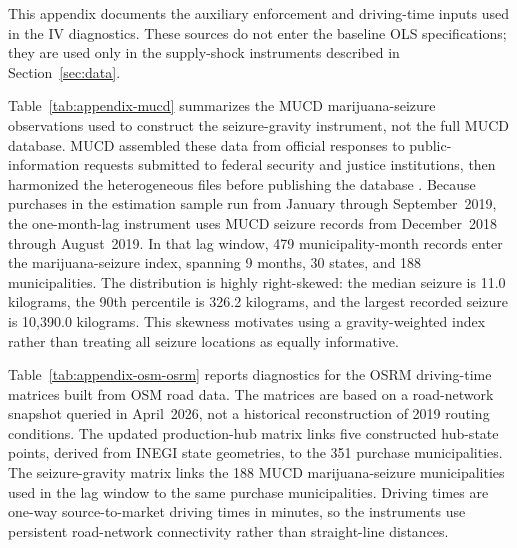 
This appendix documents the auxiliary enforcement and driving-time inputs used in the IV diagnostics.  These sources do not enter the baseline OLS specifications; they are used only in the supply-shock instruments described in Section~\ref{sec:data}.

Table~\ref{tab:appendix-mucd} summarizes the MUCD marijuana-seizure observations used to construct the seizure-gravity instrument, not the full MUCD database.  MUCD assembled these data from official responses to public-information requests submitted to federal security and justice institutions, then harmonized the heterogeneous files before publishing the database \citep{mucd2019seizures}.  Because purchases in the estimation sample run from January through September~2019, the one-month-lag instrument uses MUCD seizure records from December~2018 through August~2019.  In that lag window, 479 municipality-month records enter the marijuana-seizure index, spanning 9 months, 30 states, and 188 municipalities.  The distribution is highly right-skewed: the median seizure is 11.0 kilograms, the 90th percentile is 326.2 kilograms, and the largest recorded seizure is 10{,}390.0 kilograms.  This skewness motivates using a gravity-weighted index rather than treating all seizure locations as equally informative.



Table~\ref{tab:appendix-osm-osrm} reports diagnostics for the OSRM driving-time matrices built from OSM road data.  The matrices are based on a road-network snapshot queried in April~2026, not a historical reconstruction of 2019 routing conditions.  The updated production-hub matrix links five constructed hub-state points, derived from INEGI state geometries, to the 351 purchase municipalities.  The seizure-gravity matrix links the 188 MUCD marijuana-seizure municipalities used in the lag window to the same purchase municipalities.  Driving times are one-way source-to-market driving times in minutes, so the instruments use persistent road-network connectivity rather than straight-line distances.


